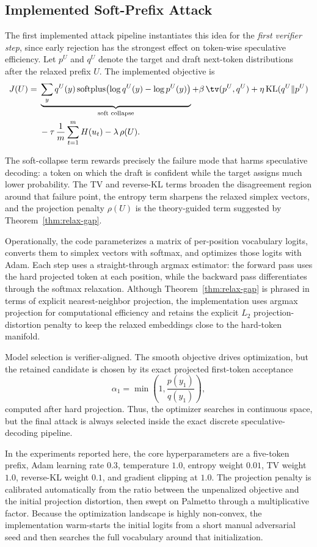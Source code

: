 \subsection{Implemented Soft-Prefix Attack}

The first implemented attack pipeline instantiates this idea for the
\emph{first verifier step}, since early rejection has the strongest effect on
token-wise speculative efficiency. Let $p^U$ and $q^U$ denote the target and
draft next-token distributions after the relaxed prefix $U$. The implemented
objective is
\begin{align*}
J(U) ={}&
\underbrace{\sum_{y} q^U(y)\,\mathrm{softplus}\!\left(\log q^U(y)-\log p^U(y)\right)}_{\text{soft collapse}}
+ \beta \,\tv(p^U, q^U)
+ \eta \,\mathrm{KL}(q^U \Vert p^U) \\
&- \tau \,\frac{1}{m}\sum_{t=1}^{m} H(u_t)
- \lambda \,\rho(U).
\end{align*}

The soft-collapse term rewards precisely the failure mode that harms
speculative decoding: a token on which the draft is confident while the target
assigns much lower probability. The TV and reverse-KL terms broaden the
disagreement region around that failure point, the entropy term sharpens the
relaxed simplex vectors, and the projection penalty $\rho(U)$ is the
theory-guided term suggested by Theorem~\ref{thm:relax-gap}.

Operationally, the code parameterizes a matrix of per-position vocabulary
logits, converts them to simplex vectors with softmax, and optimizes those
logits with Adam. Each step uses a straight-through argmax estimator: the
forward pass uses the hard projected token at each position, while the backward
pass differentiates through the softmax relaxation. Although
Theorem~\ref{thm:relax-gap} is phrased in terms of explicit nearest-neighbor
projection, the implementation uses argmax projection for computational
efficiency and retains the explicit $L_2$ projection-distortion penalty to keep
the relaxed embeddings close to the hard-token manifold.

Model selection is verifier-aligned. The smooth objective drives optimization,
but the retained candidate is chosen by its exact projected first-token
acceptance
\[
\alpha_1 = \min\!\left(1, \frac{p(y_1)}{q(y_1)}\right),
\]
computed after hard projection. Thus, the optimizer searches in continuous
space, but the final attack is always selected inside the exact discrete
speculative-decoding pipeline.

In the experiments reported here, the core hyperparameters are a five-token
prefix, Adam learning rate $0.3$, temperature $1.0$, entropy weight $0.01$, TV
weight $1.0$, reverse-KL weight $0.1$, and gradient clipping at $1.0$. The
projection penalty is calibrated automatically from the ratio between the
unpenalized objective and the initial projection distortion, then swept on
Palmetto through a multiplicative factor. Because the optimization landscape is
highly non-convex, the implementation warm-starts the initial logits from a
short manual adversarial seed and then searches the full vocabulary around that
initialization.

